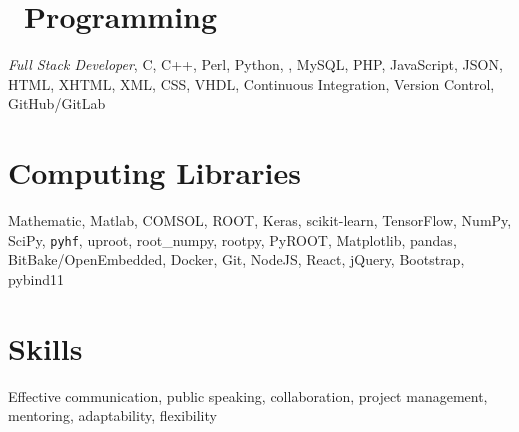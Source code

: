 \documentclass[margin,line]{resume}
\let\origsection\section%
\let\section\subsection%
\let\section\origsection%
\begin{document}
\begin{resume}
\section{\mysidestyle {}~Programming}

\textsl{Full Stack Developer}, C, C++, Perl, Python, \LaTeXe, MySQL, PHP, JavaScript, JSON, HTML, XHTML, XML, CSS, VHDL, Continuous Integration, Version Control, GitHub/GitLab

\section{\mysidestyle Computing Libraries}

Mathematic, Matlab, COMSOL, ROOT, Keras, scikit-learn, TensorFlow, NumPy, SciPy, \texttt{pyhf}, uproot, root\_numpy, rootpy, PyROOT, Matplotlib, pandas, BitBake/OpenEmbedded, Docker, Git, NodeJS, React, jQuery, Bootstrap, pybind11

\section{\mysidestyle Skills}

Effective communication, public speaking, collaboration, project management, mentoring, adaptability, flexibility

%
%
\end{resume}
\end{document}
